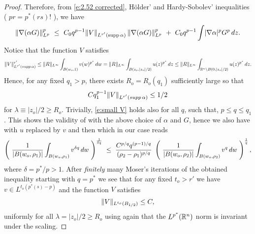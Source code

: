 \documentclass[10pt]{amsart}
\begin{document}
\begin{proof}
Therefore, from \eqref{e:2.52 corrected}, H\"older' and  Hardy-Sobolev' inequalities ( $pr=p^*(rs)$! ), we
have
\begin{equation}
\lVert\nabla(\alpha G)\rVert^p_{L^p} \ \leq\ C_0 q^{p-1}\lVert V\rVert_{L^{r'}(\text{supp}\, \alpha)}\,\lVert\nabla(\alpha G)\rVert^p_{L^p}
\ +\  C_0 q^{p-1}\int \lvert \nabla \alpha \rvert^p G^p\, dz.
\end{equation}
Notice that  the function $V$ satisfies
\[
\lVert V\rVert^{r'}_{L^{r'}(supp\, \alpha)}\leq \lVert R\rVert_{L^\infty} \int_{B(w_o,1)} v(w)^{p^*}\,d w= \lVert R\rVert_{L^\infty}\int_{B(z_o,|z_o|/2)} u(z)^{p^*}\,dz\leq \lVert R\rVert_{L^\infty}\int_{\mathbb{R}^n\setminus B(0,|z_o|/2)} u(z)^{p^*}\,dz .
\]
Hence, for any fixed $q_1 >p$, there exists $R_o=R_o(q_1)$ sufficiently large so that
\begin{equation}\label{e:small V}
Cq_1^{p-1}\lVert V\rVert_{L^{r'}(supp\, \alpha)}\leq 1/2
\end{equation}
for $\lambda\equiv |z_o|/2\geq R_o$. Trivially, \eqref{e:small V} holds also for all $q$, such that, $p\leq q\leq q_1$. This shows the validity of \cite[(2.56)]{V11} with the above choice of $\alpha$ and $G$, hence we also have \cite[(2.57)]{V11} with $u$ replaced by $v$ and then \cite[(2.58)]{V11} which in our case reads
\begin{equation}\label{e:moser}
\left(\  \frac {1}{\lvert B(w_o,{\rho_1}) \rvert}\int_{B(w_o,{\rho_1})}v^{\delta q} \,
dw\ \right)^{\frac {1}{\delta q}}\ \leq\  \frac
{C^{p/q}q^{(p-1)/q}}{({\rho_2}-{\rho_1})^{p/q}}\ \left(\  \frac
{1}{\lvert B(w_o,{\rho_2}) \rvert} \int_{B(w_o,{\rho_2})}v^{ q} \, dw\  \right)^{\frac {1}{
q}},
\end{equation}
where $\delta=p^*/p>1$. After \emph{finitely} many Moser's iterations  of the obtained inequality starting with $q=p^*$ we see that   for any fixed $t_o>r'$  we have $v\in L^{t_o(p^*(s)-p)}$ and the function $V$ satisfies
\begin{equation}\label{e:V uniform bound}
\lVert V\rVert_{L^{t_o}(B_{1/2})}\leq C,
\end{equation}
uniformly for all $\lambda=|z_o|/2\geq R_o$ using again that the $L^{p^*}(\mathbb{R}^n)$ norm is invariant under the scaling.




\end{proof}
\end{document}
